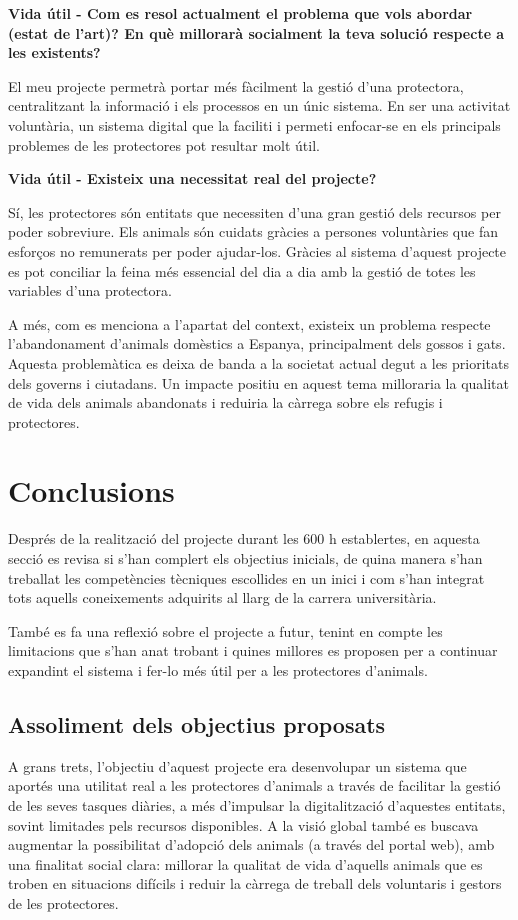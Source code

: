 \documentclass[11pt,a4paper]{report}
\begin{document}
\textbf{Vida útil - Com es resol actualment el problema que vols abordar (estat de l'art)? En què millorarà socialment la teva solució respecte a les existents?}

El meu projecte permetrà portar més fàcilment la gestió d'una protectora, centralitzant la informació i els processos en un únic sistema. En ser una activitat voluntària, un sistema digital que la faciliti i permeti enfocar-se en els principals problemes de les protectores pot resultar molt útil.

\textbf{Vida útil - Existeix una necessitat real del projecte?}

Sí, les protectores són entitats que necessiten d'una gran gestió dels recursos per poder sobreviure. Els animals són cuidats gràcies a persones voluntàries que fan esforços no remunerats per poder ajudar-los. Gràcies al sistema d'aquest projecte es pot conciliar la feina més essencial del dia a dia amb la gestió de totes les variables d'una protectora.

A més, com es menciona a l'apartat del context, existeix un problema respecte l'abandonament d'animals domèstics a Espanya, principalment dels gossos i gats. Aquesta problemàtica es deixa de banda a la societat actual degut a les prioritats dels governs i ciutadans. Un impacte positiu en aquest tema milloraria la qualitat de vida dels animals abandonats i reduiria la càrrega sobre els refugis i protectores.
\newpage
\section{Conclusions}
Després de la realització del projecte durant les 600 h establertes, en aquesta secció es revisa si s'han complert els objectius inicials, de quina manera s'han treballat les competències tècniques escollides en un inici i com s'han integrat tots aquells coneixements adquirits al llarg de la carrera universitària.

També es fa una reflexió sobre el projecte a futur, tenint en compte les limitacions que s'han anat trobant i quines millores es proposen per a continuar expandint el sistema i fer-lo més útil per a les protectores d'animals.
\subsection{Assoliment dels objectius proposats}
A grans trets, l'objectiu d'aquest projecte era desenvolupar un sistema que aportés una utilitat real a les protectores d'animals a través de facilitar la gestió de les seves tasques diàries, a més d'impulsar la digitalització d'aquestes entitats, sovint limitades pels recursos disponibles. A la visió global també es buscava augmentar la possibilitat d'adopció dels animals (a través del portal web), amb una finalitat social clara: millorar la qualitat de vida d'aquells animals que es troben en situacions difícils i reduir la càrrega de treball dels voluntaris i gestors de les protectores.
\end{document}

